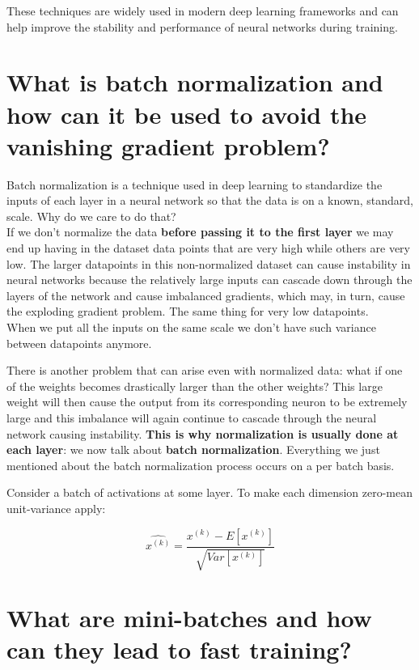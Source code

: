 \documentclass{article}
\begin{document}
These techniques are widely used in modern deep learning frameworks and can help improve the stability and performance of neural networks during training.

\newpage

\section*{What is batch normalization and how can it be used to avoid the vanishing gradient problem?}

Batch normalization is a technique used in deep learning to standardize the inputs of each layer in a neural network so that the data is on a known, standard, scale. Why do we care to do that? \\

If we don't normalize the data \textbf{before passing it to the first layer} we may end up having in the dataset data points that are very high while others are very low. The larger datapoints in this non-normalized dataset can cause instability in neural networks because the relatively large inputs can cascade down through the layers of the network and cause imbalanced gradients, which may, in turn, cause the exploding gradient problem. The same thing for very low datapoints. \\

When we put all the inputs on the same scale we don't have such variance between datapoints anymore.

There is another problem that can arise even with normalized data: what if one of the weights becomes drastically larger than the other weights? This large weight will then cause the output from its corresponding neuron to be extremely large and this imbalance will again continue to cascade through the neural network causing instability. \textbf{This is why normalization is usually done at each layer}: we now talk about \textbf{batch normalization}. Everything we just mentioned about the batch normalization process occurs on a per batch basis.

Consider a batch of activations at some layer. To make each dimension zero-mean unit-variance apply:

\begin{equation*}
    \hat{x^{(k)}} = \frac{x^{(k)} - E[x^{(k)}]}{\sqrt{Var[x^{(k)}]}} 
\end{equation*}

\newpage

\section*{What are mini-batches and how can they lead to fast training?}
\end{document}
